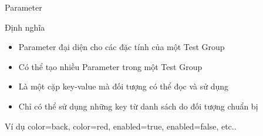 

\begin{frame}{Parameter}
	\begin{block}{Định nghĩa}
		\begin{itemize}
			\item Parameter đại diện cho các đặc tính của một Test Group
			\item Có thể tạo nhiều Parameter trong một Test Group
			\item Là một cặp key-value mà đối tượng có thể đọc và sử dụng
			\item Chỉ có thể sử dụng những key từ danh sách do đối tượng chuẩn bị
		\end{itemize}
	\end{block}
	\begin{block}{Ví dụ}
		color=back, color=red, enabled=true, enabled=false, etc..
	\end{block}
\end{frame}
